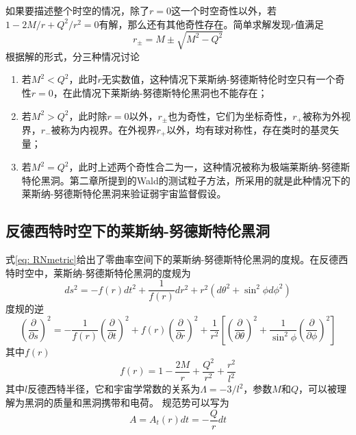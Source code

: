 如果要描述整个时空的情况，除了$r=0$这一个时空奇性以外，若$1-2M / r+Q^2 / r^2=0$有解，那么还有其他奇性存在。简单求解发现$r$值满足
\begin{equation}\label{eq: RNhorizon}
    r_{\pm}=M \pm \sqrt{M^2-Q^2}
\end{equation}
根据解的形式，分三种情况讨论
\begin{enumerate}
    \item 若$M^2<Q^2$，此时$r$无实数值，这种情况下莱斯纳-努德斯特伦时空只有一个奇性$r=0$，在此情况下莱斯纳-努德斯特伦黑洞也不能存在；
    \item 若$M^2>Q^2$，此时除$r=0$以外，$r_{\pm}$也为奇性，它们为坐标奇性\citep{梁灿彬2006微分几何入门与广义相对论}，$r_+$被称为外视界，$r_-$被称为内视界。在外视界$r_+$以外，均有球对称性，存在类时的基灵矢量；
    \item 若$M^2=Q^2$，此时上述两个奇性合二为一，这种情况被称为极端莱斯纳-努德斯特伦黑洞。第二章所提到的Wald的测试粒子方法\citep{wald1974gedanken}，所采用的就是此种情况下的莱斯纳-努德斯特伦黑洞来验证弱宇宙监督假设。
\end{enumerate}
\subsection{反德西特时空下的莱斯纳-努德斯特伦黑洞}
式\eqref{eq: RNmetric}给出了零曲率空间下的莱斯纳-努德斯特伦黑洞的度规。在反德西特时空中，莱斯纳-努德斯特伦黑洞的度规为
\begin{equation}\label{eq: RN-AdSmetric}
    ds^2=-f\left(r\right)dt^2+\frac{1}{f\left(r\right)}dr^2+r^2\left(d\theta^2+\sin^2\phi d\phi ^2\right)
\end{equation}
度规的逆
\begin{equation}\label{eq: RN-AdSinversmetric}
    \left(\frac{\partial }{\partial s}\right)^2=-\frac{1}{f\left(r\right)}\left(\frac{\partial }{\partial t}\right)^2+f\left(r\right)\left(\frac{\partial }{\partial r}\right)^2+\frac{1}{r^2}\left[\left(\frac{\partial }{\partial \theta}\right)^2+\frac{1}{\sin ^2 \phi}\left(\frac{\partial }{\partial \phi}\right)^2\right]
\end{equation}
其中$f\left(r\right)$
\begin{equation}\label{eq: f(r)}
    f\left(r\right)=1-\frac{2M}{r}+\frac{Q^2}{r^2}+\frac{r^2}{l^2}
\end{equation}
其中$l$反德西特半径，它和宇宙学常数的关系为$\Lambda=-3/l^2$，参数$M$和$Q$，可以被理解为黑洞的质量和黑洞携带和电荷。
规范势可以写为
\begin{equation}\label{eq: vectorpotion}
    A=A_t\left(r\right)dt=-\frac{Q}{r}dt
\end{equation}

